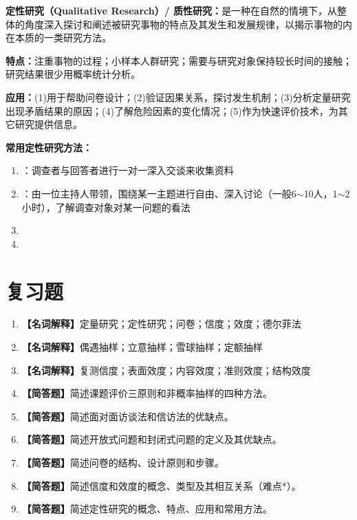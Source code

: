 \begin{keybox}
\textbf{定性研究（Qualitative Research）/ 质性研究：}是一种在自然的情境下，从整体的角度深入探讨和阐述被研究事物的特点及其发生和发展规律，以揭示事物的内在本质的一类研究方法。

\textbf{特点：}注重事物的过程；小样本人群研究；需要与研究对象保持较长时间的接触；研究结果很少用概率统计分析。

\textbf{应用：}(1)用于帮助问卷设计；(2)验证因果关系，探讨发生机制；(3)分析定量研究出现矛盾结果的原因；(4)了解危险因素的变化情况；(5)作为快速评价技术，为其它研究提供信息。

\textbf{常用定性研究方法：}
\begin{enumerate}[leftmargin=*]
    \item {}：调查者与回答者进行一对一深入交谈来收集资料
    \item {}：由一位主持人带领，围绕某一主题进行自由、深入讨论（一般6$\sim$10人，1$\sim$2小时），了解调查对象对某一问题的看法
    \item {}
    \item {}
\end{enumerate}
\end{keybox}

\section{复习题}

\begin{enumerate}[leftmargin=*, itemsep=8pt]
    \item \textbf{【名词解释】}定量研究；定性研究；问卷；信度；效度；德尔菲法
    \item \textbf{【名词解释】}偶遇抽样；立意抽样；雪球抽样；定额抽样
    \item \textbf{【名词解释】}复测信度；表面效度；内容效度；准则效度；结构效度
    \item \textbf{【简答题】}简述课题评价三原则和非概率抽样的四种方法。
    \item \textbf{【简答题】}简述面对面访谈法和信访法的优缺点。
    \item \textbf{【简答题】}简述开放式问题和封闭式问题的定义及其优缺点。
    \item \textbf{【简答题】}简述问卷的结构、设计原则和步骤。
    \item \textbf{【简答题】}简述信度和效度的概念、类型及其相互关系（难点*）。
    \item \textbf{【简答题】}简述定性研究的概念、特点、应用和常用方法。
\end{enumerate}

